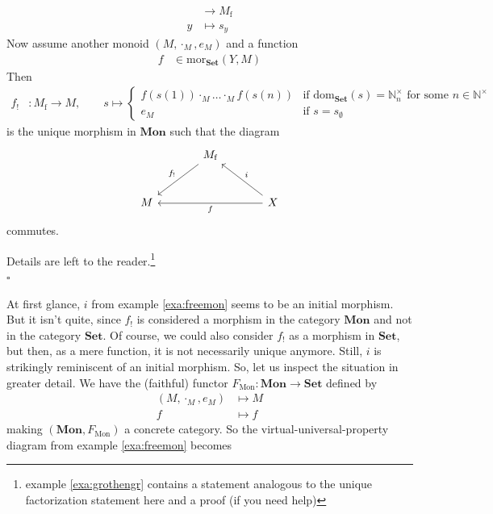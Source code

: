 \begin{exa}
\begin{align*}
  &\rightarrow
  M_{\textrm{f}}
  \\
  y
  &\mapsto
  s_{y}
\end{align*}
Now assume another monoid $(M,\cdot_{M},e_{M})$ and a function
\begin{align*}
  f
  &\in
  \mathrm{mor}_{\mathbf{Set}}(Y,M)
\end{align*}
Then
\begin{align*}
  f_{!}
  &\colon
  M_{\textrm{f}}
  \rightarrow
  M
  ,\qquad
  s
  \mapsto
  \begin{cases}
    f(s(1))
    \cdot_{M}
    \ldots
    \cdot_{M}
    f(s(n))
    &
    \text{if }
    \mathrm{dom}_{\mathbf{Set}}(s)
    =
    \mathbb{N}_{n}^{\times}
    \text{ for some }
    n
    \in
    \mathbb{N}^{\times}
    \\
    e_{M}
    &
    \text{if }
    s
    =
    s_{\emptyset}
  \end{cases}
\end{align*}
is the unique morphism in $\mathbf{Mon}$ such that the diagram
\[
\begin{tikzcd}[sep=large]
  &
  M_{\textrm{f}}
  \arrow[swap]{dl}{f_{!}}
  &
  \\
  M
  &
  &
  X
  \arrow{ll}{f}
  \arrow[swap]{lu}{i}
\end{tikzcd}
\]
commutes.
\end{exa}
\begin{prf}
Details are left to the reader.\footnote{example \ref{exa:grothengr} contains a statement analogous to the unique factorization statement here and a proof (if you need help)}
\\
\phantom{proven}
\hfill
$\square$
\end{prf}
At first glance, $i$ from example \ref{exa:freemon} seems to be an initial morphism.
But it isn't quite, since $f_{!}$ is considered a morphism in the category $\mathbf{Mon}$ and not in the category $\mathbf{Set}$.
Of course, we could also consider $f_{!}$ as a morphism in $\mathbf{Set}$, but then, as a mere function, it is not necessarily unique anymore.
Still, $i$ is strikingly reminiscent of an initial morphism.
So, let us inspect the situation in greater detail.
We have the (faithful) functor $F_{\textrm{Mon}} \colon \mathbf{Mon} \rightarrow \mathbf{Set}$ defined by
\begin{align*}
  (M,\cdot_{M},e_{M})
  &\mapsto
  M
  \\
  f
  &\mapsto
  f
\end{align*}
making $(\mathbf{Mon},F_{\textrm{Mon}})$ a concrete category.
So the virtual-universal-property diagram from example \ref{exa:freemon} becomes

